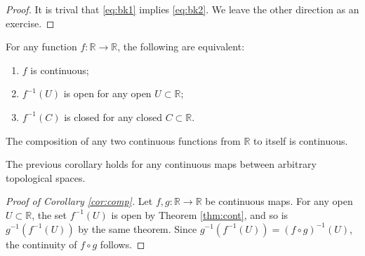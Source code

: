 \documentclass{amsart}
\numberwithin{equation}{section}
\begin{document}
\begin{proof}
It is trival that \eqref{eq:bk1} implies \eqref{eq:bk2}.
We leave the other direction as an exercise.
\end{proof}

\begin{theorem}[continuity] \label{thm:cont}
For any function $f \colon \mathbb{R} \to \mathbb{R}$, the following are
equivalent:
\begin{enumerate}
\item
$f$ is continuous;
\item
$f^{-1}(U)$ is open for any open $U \subset \mathbb{R}$;
\item
$f^{-1}(C)$ is closed for any closed $C \subset \mathbb{R}$.
\end{enumerate}
\end{theorem}

\begin{corollary} \label{cor:comp}
The composition of any two continuous functions from $\mathbb{R}$ to
itself is continuous.
\end{corollary}

\begin{remark}
The previous corollary holds for any continuous maps between
arbitrary topological spaces.
\end{remark}

\begin{proof}[Proof of Corollary \ref{cor:comp}]
Let $f,g \colon \mathbb{R} \to \mathbb{R}$ be continuous maps.
For any open $U \subset \mathbb{R}$, the set $f^{-1}(U)$ is open
by Theorem \ref{thm:cont}, and so is $g^{-1}(f^{-1}(U))$ by the same theorem.
Since $g^{-1}(f^{-1}(U)) = (f\circ g)^{-1}(U)$, the continuity of
$f \circ g$ follows.
\end{proof}

%
%
%
\end{document}
